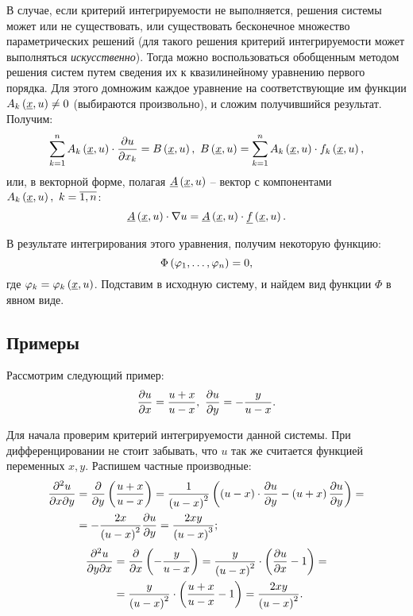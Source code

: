 	В случае, если критерий интегрируемости не выполняется, решения системы может или не существовать, или существовать бесконечное множество параметрических решений (для такого решения критерий интегрируемости может выполняться \textit{искусственно}). Тогда можно воспользоваться обобщенным методом решения систем путем сведения их к квазилинейному уравнению первого порядка. Для этого домножим каждое уравнение на соответствующие им функции $A_k\left( \underline{x}, u \right) \neq 0$ (выбираются произвольно), и сложим получившийся результат. Получим:
	\[ \sum_{k=1}^n A_k \left( \underline{x}, u \right) \cdot \dfrac{\partial u}{\partial x_k} = B\left( \underline{x}, u \right), ~ B\left( \underline{x}, u \right) = \sum_{k=1}^n A_k \left( \underline{x}, u \right) \cdot f_k \left( \underline{x}, u \right), \]
	или, в векторной форме, полагая \( \underline{A} \left( \underline{x}, u \right) \) -- вектор с компонентами $A_k\left( \underline{x}, u \right), ~ k = \overline{1, n}$:
	\[ \underline{A} \left( \underline{x}, u \right) \cdot \nabla{u} = \underline{A} \left( \underline{x}, u \right) \cdot \underline{f} \left( \underline{x}, u \right). \]

	В результате интегрирования этого уравнения, получим некоторую функцию:
	\[ \Phi\left( \varphi_1, \dots, \varphi_n \right) = 0, \]
	где $\varphi_k = \varphi_k \left( \underline{x}, u \right)$. Подставим в исходную систему, и найдем вид функции $\Phi$ в явном виде.

	\subsection{Примеры}

		Рассмотрим следующий пример:
		\[ \dfrac{\partial u}{\partial x} = \frac{u + x}{u - x}, ~ \dfrac{\partial u}{\partial y} = - \frac{y}{u - x}. \] %

		Для начала проверим критерий интегрируемости данной системы. При дифференцировании не стоит забывать, что $u$ так же считается функцией переменных $x, y$. Распишем частные производные:
		\[ \begin{split} 
			\dfrac{\partial^2 u}{\partial x \partial y} &= \dfrac{\partial }{\partial y} \left( \frac{u + x}{u - x} \right) = \frac{1}{\left( u - x \right)^2} \left(  \left( u - x \right) \cdot \dfrac{\partial u}{\partial y} - \left( u + x \right) \dfrac{\partial u}{\partial y}  \right) = \\ 
			&= -\frac{2x}{\left( u - x \right)^2} \dfrac{\partial u}{\partial y} = \frac{2xy}{\left( u - x \right)^3};
		\end{split} \]
		\[ \begin{split} 
			\dfrac{\partial^2 u}{\partial y \partial x} &= \dfrac{\partial }{\partial x} \left( -\frac{y}{u - x} \right) = \frac{y}{\left( u - x \right)^2} \cdot \left( \dfrac{\partial u}{\partial x} - 1 \right) = \\ 
			&= \frac{y}{\left( u - x \right)^2} \cdot \left(  \frac{u + x}{u - x} - 1  \right) = \frac{2xy}{\left( u - x \right)^2}.
		\end{split} \]

